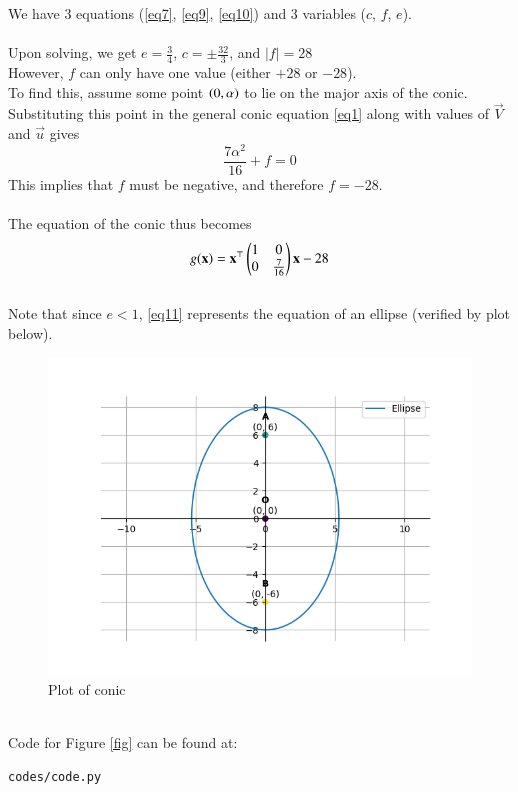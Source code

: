 \documentclass[journal]{IEEEtran}
\begin{document}
We have 3 equations (\ref{eq7}, \ref{eq9}, \ref{eq10}) and 3 variables ($c$, $f$, $e$).
\\ \\
Upon solving, we get $e=\frac{3}{4}$, $c=\pm\frac{32}{3}$, and $|f|=28$
\\
However, $f$ can only have one value (either $+28$ or $-28$).
\\
To find this, assume some point $\left(0,\alpha\right)$ to lie on the major axis of the conic. Substituting this point in the general conic equation \ref{eq1} along with values of $\vec{V}$ and $\vec{u}$ gives $$\frac{7\alpha^2}{16}+f=0$$
This implies that $f$ must be negative, and therefore $f=-28$.
\\ \\
The equation of the conic thus becomes 
\begin{align}
g(\mathbf{x}) = \mathbf{x}^\top\begin{pmatrix}1&0\\0&\frac{7}{16}\end{pmatrix}\mathbf{x}-28 \label{eq11}
\end{align}
\\
Note that since $e<1$, \eqref{eq11} represents the equation of an ellipse (verified by plot below).
\\
\begin{figure}[h]
	\centering
	\includegraphics[width=\columnwidth]{figs/fig.png}
	\caption{Plot of conic}
	\label{fig:fig}
\end{figure}
\\
Code for Figure \ref{fig} can be found at:
\begin{lstlisting}
codes/code.py
\end{lstlisting}
\end{document}

